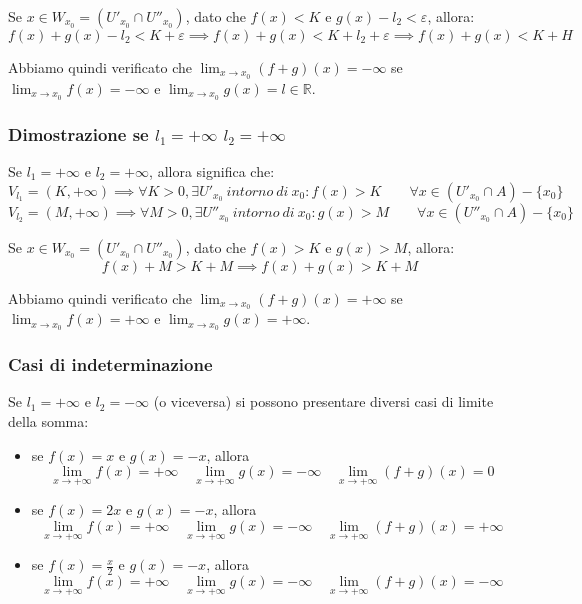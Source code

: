 \documentclass{article}
\begin{document}
\noindent Se $x \in W_{x_0} = (U'_{x_0} \cap U''_{x_0})$, dato che $f(x) < K$ e $g(x) - l_2 < \varepsilon$, allora:
\begin{equation*}
    f(x) + g(x) - l_2 < K + \varepsilon \implies f(x) + g(x) < K + l_2 + \varepsilon \implies f(x) + g(x) < K + H
\end{equation*}

\noindent Abbiamo quindi verificato che $\lim_{x \to x_0} (f + g)(x) = -\infty$ se $\lim_{x \to x_0} f(x) = -\infty$ e $\lim_{x \to x_0} g(x) = l \in \mathbb{R}$.

\subsubsection{Dimostrazione se $l_1 = +\infty$ $l_2 = +\infty$}
Se $l_1 = +\infty$ e $l_2 = +\infty$, allora significa che: 
\begin{equation*}
    V_{l_1} = (K, + \infty) \implies \forall K > 0, \exists U'_{x_0} \ intorno \ di \ x_0 : f(x) > K \qquad \forall x \in (U'_{x_0} \cap A) - \{x_0\}
\end{equation*}
\begin{equation*}
    V_{l_2} = (M, + \infty) \implies \forall M > 0, \exists U''_{x_0} \ intorno \ di \ x_0 : g(x) > M \qquad \forall x \in (U''_{x_0} \cap A) - \{x_0\}
\end{equation*}

\noindent Se $x \in W_{x_0} = (U'_{x_0} \cap U''_{x_0})$, dato che $f(x) > K$ e $g(x) > M$, allora:
\begin{equation*}
    f(x) + M > K + M \implies f(x) + g(x) > K + M
\end{equation*}

\noindent Abbiamo quindi verificato che $\lim_{x \to x_0} (f + g)(x) = +\infty$ se $\lim_{x \to x_0} f(x) = +\infty$ e $\lim_{x \to x_0} g(x) = +\infty$.

\subsubsection{Casi di indeterminazione}
Se $l_1 = + \infty$ e $l_2 = -\infty$ (o viceversa) si possono presentare diversi casi di limite della somma:

\begin{itemize}
    \item se $f(x) = x$ e $g(x) = -x$, allora $$\lim_{x \to +\infty} f(x) = +\infty \quad \lim_{x \to +\infty} g(x) = - \infty \quad \lim_{x \to +\infty} (f+g)(x) = 0$$
    \item se $f(x) = 2x$ e $g(x) = -x$, allora $$\lim_{x \to +\infty} f(x) = +\infty \quad \lim_{x \to +\infty} g(x) = - \infty \quad \lim_{x \to +\infty} (f+g)(x) = +\infty$$
    \item se $f(x) = \frac{x}{2}$ e $g(x) = -x$, allora $$\lim_{x \to +\infty} f(x) = +\infty \quad \lim_{x \to +\infty} g(x) = - \infty \quad \lim_{x \to +\infty} (f+g)(x) = -\infty$$
\end{itemize}
\end{document}

